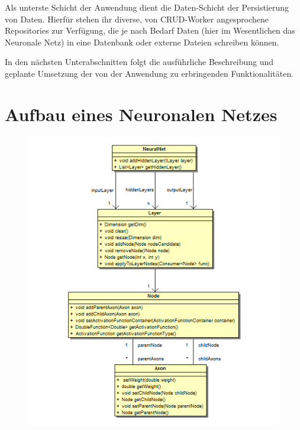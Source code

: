 Als unterste Schicht der Anwendung dient die Daten-Schicht der Persistierung von Daten. Hierfür stehen ihr diverse, von CRUD-Worker angesprochene Repositories zur Verfügung, die je nach Bedarf Daten (hier im Wesentlichen das Neuronale Netz) in eine Datenbank oder externe Dateien schreiben können.

In den nächsten Unterabschnitten folgt die ausführliche Beschreibung und geplante Umsetzung der von der Anwendung zu erbringenden Funktionalitäten.  



\section{Aufbau eines Neuronalen Netzes}

\begin{figure}[h]
\begin{center}
\includegraphics{Abbildungen/UML/uml_ronny/neuralnetclass.png}
\end{center}
\end{figure}

